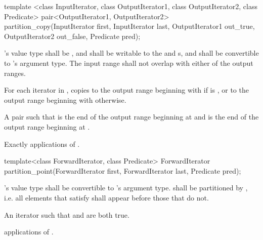 %
\begin{itemdecl}
template <class InputIterator, class OutputIterator1,
          class OutputIterator2, class Predicate>
  pair<OutputIterator1, OutputIterator2>
  partition_copy(InputIterator first, InputIterator last,
                 OutputIterator1 out_true, OutputIterator2 out_false,
                 Predicate pred);
\end{itemdecl}


\begin{itemdescr}
\pnum
\requires {}'s value type shall be , and shall be
writable to the  and  s, and shall be
convertible to 's argument type. The input range shall not overlap with
either of the output ranges.

\pnum
\effects For each iterator  in , copies  to the output range beginning with  if  is , or to the output range beginning with  otherwise.

\pnum
\returns A pair  such that  is the end of the output range beginning at  and  is the end of the output range beginning at .

\pnum
\complexity Exactly  applications of .
\end{itemdescr}

%
\begin{itemdecl}
template<class ForwardIterator, class Predicate>
  ForwardIterator partition_point(ForwardIterator first,
                                  ForwardIterator last,
                                  Predicate pred);
\end{itemdecl}


\begin{itemdescr}
\pnum
\requires {}'s value type shall be convertible to 's argument type.  shall be partitioned by , i.e. all elements that satisfy  shall appear before those that do not.

\pnum
\returns An iterator  such that  and  are both true.

\pnum
\complexity {} applications of .
\end{itemdescr}


